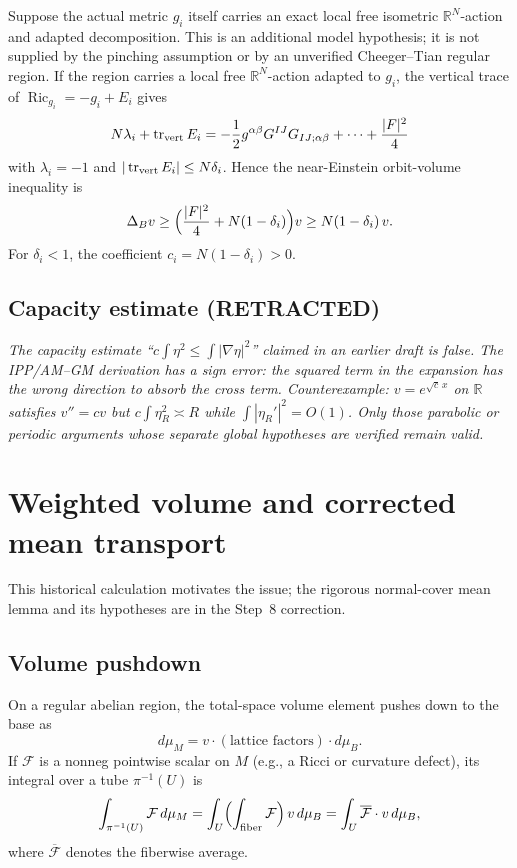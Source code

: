 Suppose the actual metric $g_i$ itself carries an exact local free isometric
$\mathbb R^N$-action and adapted decomposition.  This is an additional model
hypothesis; it is not supplied by the pinching assumption or by an unverified
Cheeger--Tian regular region.
If the region carries a local free $\mathbb R^N$-action adapted to $g_i$,
the vertical trace of $\operatorname{Ric}_{g_i}=-g_i+E_i$ gives
\[
 N\lambda_i+\operatorname{tr}_{\rm vert}E_i
 =-\frac12 g^{\alpha\beta}G^{IJ}G_{IJ;\alpha\beta}+\cdots+\frac{|F|^2}{4}
\]
with $\lambda_i=-1$ and $|\operatorname{tr}_{\rm vert}E_i|\le N\delta_i$.
Hence the near-Einstein orbit-volume inequality is
\begin{equation}\label{eq:nearein}
 \Delta_B v\ge\Bigl(\frac{|F|^2}{4}+N(1-\delta_i)\Bigr)v
 \ge N(1-\delta_i)\,v.
\end{equation}
For $\delta_i<1$, the coefficient $c_i=N(1-\delta_i)>0$.

\subsection*{Capacity estimate (RETRACTED)}
\emph{The capacity estimate ``$c\int\eta^2\le\int|\nabla\eta|^2$''
claimed in an earlier draft is false.  The IPP/AM--GM derivation has
a sign error: the squared term in the expansion has the wrong direction
to absorb the cross term.  Counterexample: $v=e^{\sqrt c\,x}$ on
$\mathbb R$ satisfies $v''=cv$ but $c\int\eta_R^2\asymp R$ while
$\int|\eta_R'|^2=O(1)$.  Only those parabolic or periodic arguments whose
separate global hypotheses are verified remain valid.}

\section{Weighted volume and corrected mean transport}

This historical calculation motivates the issue; the rigorous normal-cover
mean lemma and its hypotheses are in the Step~8 correction.

\subsection*{Volume pushdown}
On a regular abelian region, the total-space volume element pushes down
to the base as
\[
 d\mu_M=v\cdot(\text{lattice factors})\cdot d\mu_B.
\]
If $\mathcal F$ is a nonneg pointwise scalar on $M$ (e.g., a Ricci
or curvature defect), its integral over a tube $\pi^{-1}(U)$ is
\[
 \int_{\pi^{-1}(U)}\mathcal F\,d\mu_M
 =\int_U\Bigl(\int_{\text{fiber}}\mathcal F\Bigr)\,v\,d\mu_B
 =\int_U\overline{\mathcal F}\cdot v\,d\mu_B,
\]
where $\overline{\mathcal F}$ denotes the fiberwise average.

